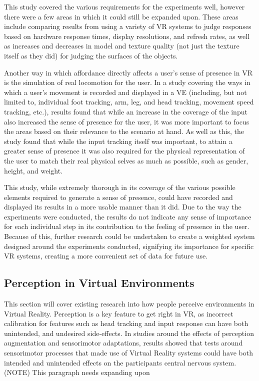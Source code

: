 \begin{multicols*}{2}
		This study covered the various requirements for the experiments well, however there were a few areas in which it could still be expanded upon.
		These areas include comparing results from using a variety of VR systems to judge responses based on hardware response times, display resolutions, and refresh rates, as well as increases and decreases in model and texture quality (not just the texture itself as they did) for judging the surfaces of the objects.

		Another way in which affordance directly affects a user's sense of presence in VR is the simulation of real locomotion for the user.
		In a study \cite{Turchet2015} covering the ways in which a user's movement is recorded and displayed in a VE (including, but not limited to, individual foot tracking, arm, leg, and head tracking, movement speed tracking, etc.), results found that while an increase in the coverage of the input also increased the sense of presence for the user, it was more important to focus the areas based on their relevance to the scenario at hand.
		As well as this, the study found that while the input tracking itself was important, to attain a greater sense of presence it was also required for the physical representation of the user to match their real physical selves as much as possible, such as gender, height, and weight.

		This study, while extremely thorough in its coverage of the various possible elements required to generate a sense of presence, could have recorded and displayed its results in a more usable manner than it did.
		Due to the way the experiments were conducted, the results do not indicate any sense of importance for each individual step in its contribution to the feeling of presence in the user.
		Because of this, further research could be undertaken to create a weighted system designed around the experiments conducted, signifying its importance for specific VR systems, creating a more convenient set of data for future use.

	\subsection{Perception in Virtual Environments}
	\label{lr:vr:perception}
		This section will cover existing research into how people perceive environments in Virtual Reality.
		Perception is a key feature to get right in VR, as incorrect calibration for features such as head tracking and input response can have both unintended, and undesired side-effects. In studies \cite{Wright2006}  \cite{Wright2009} \cite{Wright2011} \cite{Wright2013} \cite{Wright2014} around the effects of perception augmentation and sensorimotor adaptations, results showed that tests around sensorimotor processes that made use of Virtual Reality systems could have both intended and unintended effects on the participants central nervous system. 
		(NOTE) This paragraph needs expanding upon



\end{multicols*}
